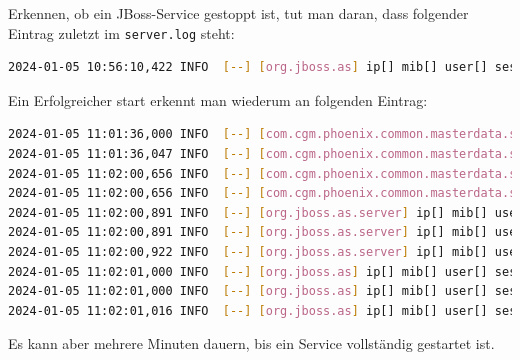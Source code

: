 \begin{flushleft}
    Erkennen, ob ein \Gls{JBoss}-Service gestoppt ist, tut man daran, dass folgender Eintrag zuletzt im \texttt{server.log} steht:
    \lstset{style=gra_codestyle}
    \begin{lstlisting}[language=sh, caption=Service gestoppt - server.log,captionpos=b,label={lst:service-stopped-service.log},breaklines=true]
2024-01-05 10:56:10,422 INFO  [--] [org.jboss.as] ip[] mib[] user[] session[] request[] thread[MSC service thread 1-3]: WFLYSRV0050: JBoss EAP 7.4.8.GA (WildFly Core 15.0.19.Final-redhat-00001) stopped in 1199ms
    \end{lstlisting}
    Ein Erfolgreicher start erkennt man wiederum an folgenden Eintrag:
    \lstset{style=gra_codestyle}
    \begin{lstlisting}[language=sh, caption=Service gestartet - server.log,captionpos=b,label={lst:service-started-service.log},breaklines=true]
2024-01-05 11:01:36,000 INFO  [--] [com.cgm.phoenix.common.masterdata.srv.catalog.dao.CatalogValueDAO] ip[] mib[] user[] session[] request[] thread[ServerService Thread Pool -- 273]: Creating folder index...
2024-01-05 11:01:36,047 INFO  [--] [com.cgm.phoenix.common.masterdata.srv.catalog.dao.CatalogValueDAO] ip[] mib[] user[] session[] request[] thread[ServerService Thread Pool -- 273]: Creating search index...
2024-01-05 11:02:00,656 INFO  [--] [com.cgm.phoenix.common.masterdata.srv.catalog.dao.CatalogValueDAO] ip[] mib[] user[] session[] request[] thread[ServerService Thread Pool -- 273]: Catalog data loaded.
2024-01-05 11:02:00,656 INFO  [--] [com.cgm.phoenix.common.masterdata.srv.catalog.CatalogCacheProvider] ip[] mib[] user[] session[] request[] thread[ServerService Thread Pool -- 273]: Instant Catalogs successfully initialized.
2024-01-05 11:02:00,891 INFO  [--] [org.jboss.as.server] ip[] mib[] user[] session[] request[] thread[ServerService Thread Pool -- 43]: WFLYSRV0010: Deployed "phoenix.ear" (runtime-name : "phoenix.ear")
2024-01-05 11:02:00,891 INFO  [--] [org.jboss.as.server] ip[] mib[] user[] session[] request[] thread[ServerService Thread Pool -- 43]: WFLYSRV0010: Deployed "jolokia.war" (runtime-name : "jolokia.war")
2024-01-05 11:02:00,922 INFO  [--] [org.jboss.as.server] ip[] mib[] user[] session[] request[] thread[Controller Boot Thread]: WFLYSRV0212: Resuming server
2024-01-05 11:02:01,000 INFO  [--] [org.jboss.as] ip[] mib[] user[] session[] request[] thread[Controller Boot Thread]: WFLYSRV0025: JBoss EAP 7.4.8.GA (WildFly Core 15.0.19.Final-redhat-00001) started in 281140ms - Started 18250 of 18473 services (563 services are lazy, passive or on-demand)
2024-01-05 11:02:01,000 INFO  [--] [org.jboss.as] ip[] mib[] user[] session[] request[] thread[Controller Boot Thread]: WFLYSRV0060: Http management interface listening on http://10.0.22.52:9990/management
2024-01-05 11:02:01,016 INFO  [--] [org.jboss.as] ip[] mib[] user[] session[] request[] thread[Controller Boot Thread]: WFLYSRV0051: Admin console listening on http://10.0.22.52:9990
    \end{lstlisting}

    Es kann aber mehrere Minuten dauern, bis ein Service vollständig gestartet ist.
\end{flushleft}
